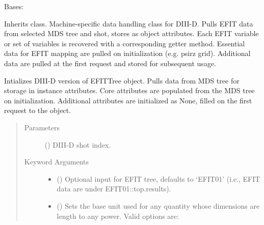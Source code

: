 \documentclass[letterpaper,10pt,english]{sphinxmanual}
\begin{document}
\begin{fulllineitems}
\label{\detokenize{eqtools:eqtools.D3DEFIT.D3DEFITTree}}
Bases: {\hyperref[\detokenize{eqtools:eqtools.EFIT.EFITTree}]{}}

Inherits {\hyperref[\detokenize{eqtools:eqtools.EFIT.EFITTree}]{}} class. Machine-specific data
handling class for DIII-D. Pulls EFIT data from selected MDS tree
and shot, stores as object attributes. Each EFIT variable or set of
variables is recovered with a corresponding getter method. Essential data
for EFIT mapping are pulled on initialization (e.g. psirz grid). Additional
data are pulled at the first request and stored for subsequent usage.

Intializes DIII-D version of EFITTree object.  Pulls data from MDS tree for
storage in instance attributes.  Core attributes are populated from the MDS
tree on initialization.  Additional attributes are initialized as None,
filled on the first request to the object.
\begin{quote}\begin{description}
\item[{Parameters}] \leavevmode
{} () \textendash{} DIII-D shot index.

\item[{Keyword Arguments}] \leavevmode\begin{itemize}
\item {} 
 () \textendash{} Optional input for EFIT tree, defaults to ‘EFIT01’
(i.e., EFIT data are under EFIT01::top.results).

\item {} 
 () \textendash{} 
Sets the base unit used for any quantity whose
dimensions are length to any power. Valid options are:
\begin{quote}



\end{quote}
\end{itemize}
\end{description}
\end{quote}
\end{fulllineitems}
\end{document}
